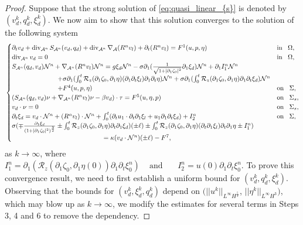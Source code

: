 \documentclass[letterpaper,reqno,10pt,twoside]{amsart}
\theoremstyle{definition}
\theoremstyle{remark}
\def\p{\partial}
\def\dive{\mathop{\rm div}\nolimits}
\begin{document}
\begin{proof}
		Suppose that the strong solution of \eqref{eq:quasi_linear_{s}} is denoted by $(v_{d}^{k},q_{d}^{k},\xi_{d}^{k})$. We now aim to show that this solution converges to the solution of the following system
		\begin{equation}{\label{eq:quasi_linear_{s2}}}
			\begin{cases}
				\partial_{t}v_{d}+\operatorname{div}_{\mathcal{A}^{n}}S_{\mathcal{A}^{n}}(v_{d},q_{d})+\dive_{\mathcal{A}^{n}}\nabla_{\mathcal{A}}(R^{n}v_{l})+\p_{t}(R^{n}v_{l})=F^{1}(u,p,\eta)~~~&\operatorname{in}~~\Omega,\\
				\operatorname{div}_{\mathcal{A}^{n}}v_{d}=0~~~&\operatorname{in}~~\Omega,\\
				S_{\mathcal{A}^{n}}(q_{d},v_{d})\mathcal{N}^{n}+\nabla_{\mathcal{A}^{n}}(R^{n}v_{l})\mathcal{N}^{n}=g\xi_{d}\mathcal{N}^{n}-\sigma\partial_{1}(\frac{1}{\sqrt{1+\vert \partial_{1}\zeta_{0}\vert^{2}}}\partial_{1}\xi_{d})\mathcal{N}^{n}+\p_{1}I_{1}^{n}\mathcal{N}^{n}\\
				\quad\quad\quad\quad\quad\quad\quad+\sigma\partial_{1}(\int_{0}^{t}\mathcal{R}_{z}(\partial_{1}\zeta_{0},\partial_{1}\eta)(\partial_{1}\p_{t}\xi_{l})\p_{1}\p_{t}\eta)\mathcal{N}^{n}+\sigma\partial_{1}(\int_{0}^{t}\mathcal{R}_{z}(\partial_{1}\zeta_{0},\partial_{1}\eta)\partial_{1}\partial_{t}\xi_{d})\mathcal{N}^{n}\\
				\quad\quad\quad\quad\quad\quad\quad+F^{4}(u,p,\eta)~~~&\operatorname{on}~~\Sigma,\\
				(S_{\mathcal{A}^{n}}(q_{d},v_{d})\nu+\nabla_{\mathcal{A}^{n}}(R^{n}v_{l})\nu-\beta v_{d})\cdot \tau=F^{5}(u,\eta,p)~~~&\operatorname{on}~~\Sigma_{s},\\
				v_{d}\cdot \nu=0~~~&\operatorname{on}~~\Sigma_{s},\\
				\partial_{t}\xi_{d}=v_{d}\cdot \mathcal{N}^{n}+(R^{n}v_{l})\cdot \mathcal{N}^{n}+\int_{0}^{t}(\partial_{t}u_{1}\cdot\partial_{t}\p_{1}\xi_{l}+u_{1}\partial_{1}\partial_{t}\xi_{d})+I_{2}^{n}~~~&\operatorname{on}~~\Sigma,\\
				\sigma(\mp \frac{\partial_{1}\xi_{d}}{(1+\vert \partial_{1}\zeta_{0}\vert^{2})^{\frac{3}{2}}}\pm \int_{0}^{t}\mathcal{R}_{z}(\partial_{1}\zeta_{0},\partial_{1}\eta)\partial_{t}\partial_{1}\xi_{d})(\pm \ell)\pm\int_{0}^{t}\mathcal{R}_{z}(\p_{1}\zeta_{0},\p_{1}\eta)(\p_{t}\p_{1}\xi_{l})\p_{t}\p_{1}\eta\pm I_{1}^{n})\\
				\qquad\qquad\qquad\qquad\qquad\qquad\qquad=\kappa (v_{d}\cdot \mathcal{N}^{n})(\pm \ell)-{F}^{7},
			\end{cases}
		\end{equation}
		as $k\to \infty$, where
		$I_{1}^{n}=\p_{1}(\mathcal{R}_{z}(\p_{1}\zeta_{0},\p_{1}\eta(0))\p_{1}\p_{t}\xi_{0}^{n})~~~~\operatorname{and }~~~~~~~I_{2}^{n}=u(0)\p_{1}\p_{t}\xi_{0}^{n}$.
		To prove this convergence result, we need to first establish a uniform bound for $(v_{d}^{k},q_{d}^{k},\xi_{d}^{k})$. Observing that the bounds for $(v_{d}^{k},\xi_{d}^{k},q_{d}^{k})$ depend on $(\vert \vert u^{k}\vert \vert_{L^{\infty}H^{\frac{5}{2}}}$, $\vert \vert \eta^{k}\vert \vert_{L^{\infty}H^{3}})$, which may blow up as $k\rightarrow \infty$, we modify the estimates for several terms in Steps 3, 4 and 6 to remove the dependency.
		

\end{proof}
\end{document}
